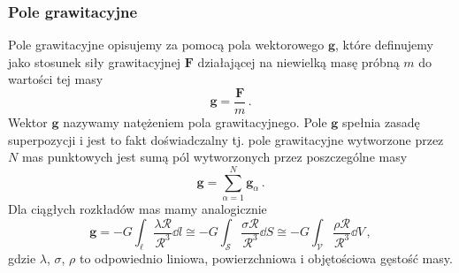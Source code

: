 \documentclass[../main.tex]{subfiles}
\begin{document}
\subsubsection{Pole grawitacyjne}
Pole grawitacyjne opisujemy za pomocą pola wektorowego \(\mathbf{g}\), które definujemy jako stosunek siły grawitacyjnej \(\mathbf{F}\) działającej na niewielką masę próbną \(m\) do wartości tej masy
\begin{equation*}
    \mathbf{g}=\frac{\mathbf{F}}{m}\,.
\end{equation*}
Wektor \(\mathbf{g}\) nazywamy natężeniem pola grawitacyjnego. Pole \(\mathbf{g}\) spełnia zasadę superpozycji i jest to fakt doświadczalny tj. pole grawitacyjne wytworzone przez \(N\) mas punktowych jest sumą pól wytworzonych przez poszczególne masy
\begin{equation*}
    \mathbf{g}=\sum_{\alpha=1}^N\mathbf{g}_\alpha \,.
\end{equation*}
Dla ciągłych rozkładów mas mamy analogicznie
\begin{equation*}
    \mathbf{g}=-G\int_\ell \frac{\lambda \boldsymbol{\mathcal{R}}}{\mathcal{R}^3}\dd{l}\cong -G\int_\mathcal{S} \frac{\sigma \boldsymbol{{\mathcal{R}}}}{\mathcal{R}^3}\dd{S}\cong -G\int_\mathcal{V} \frac{\rho \boldsymbol{{\mathcal{R}}}}{\mathcal{R}^3}\dd{V}\,,
\end{equation*}
gdzie \(\lambda\), \(\sigma\), \(\rho\) to odpowiednio liniowa, powierzchniowa i objętościowa gęstość masy.
\end{document}
